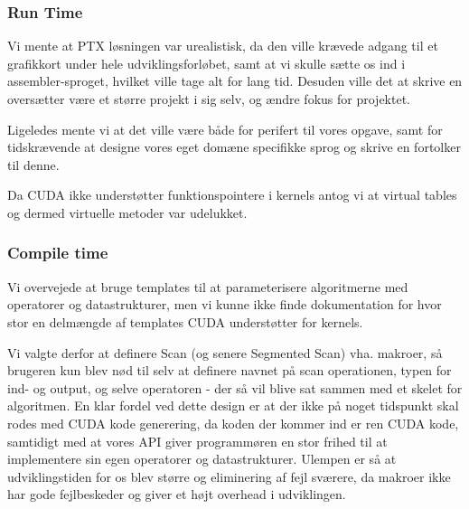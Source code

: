 \subsubsection{Run Time}
Vi mente at PTX løsningen var urealistisk, da den ville krævede adgang
til et grafikkort under hele udviklingsforløbet, samt at vi skulle sætte os ind i assembler-sproget, hvilket ville tage alt for lang tid. Desuden ville det at skrive en oversætter være et større projekt i sig selv, og ændre fokus for projektet.

Ligeledes mente vi at det ville være både for perifert til vores opgave, samt for tidskrævende at designe vores eget domæne specifikke sprog og skrive en fortolker til denne.

Da CUDA ikke understøtter funktionspointere i kernels antog vi at virtual tables og dermed virtuelle metoder var udelukket. 

\subsubsection{Compile time}
Vi overvejede at bruge templates til at parameterisere algoritmerne med operatorer og datastrukturer, men vi
kunne ikke finde dokumentation for hvor stor en delmængde af templates CUDA understøtter for kernels.

Vi valgte derfor at definere Scan (og senere Segmented Scan) vha. makroer, så brugeren kun blev nød til selv at definere navnet på scan operationen, typen for ind- og output, og selve operatoren -  der så vil blive sat sammen med et skelet for algoritmen. En klar fordel ved dette design er at der ikke på noget tidspunkt skal rodes med CUDA kode
generering, da koden der kommer ind er ren CUDA kode, samtidigt med at vores API giver programmøren en stor frihed til at implementere sin egen operatorer og datastrukturer. Ulempen er så at udviklingstiden for os blev større og eliminering af fejl sværere, da makroer ikke har gode fejlbeskeder og giver et højt overhead i udviklingen.
